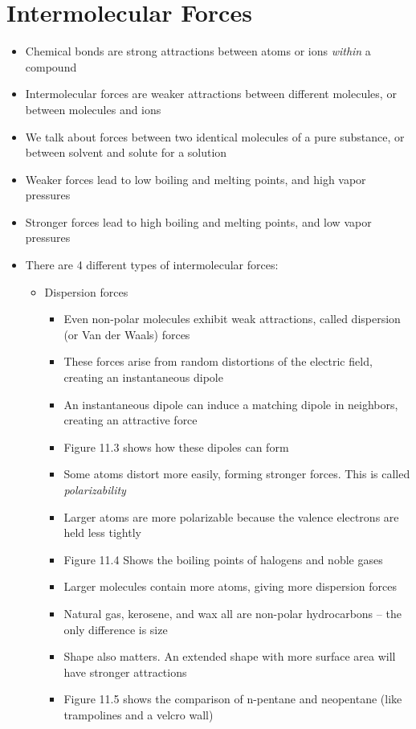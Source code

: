 \documentclass[12pt, openany, letterpaper]{memoir}
\begin{document}
\section{Intermolecular Forces}
\begin{itemize}
	\item Chemical bonds are strong attractions between atoms or ions \emph{within} a compound
	\item Intermolecular forces are weaker attractions between different molecules, or between molecules and ions
	\item We talk about forces between two identical molecules of a pure substance, or between solvent and solute for a solution
	\item Weaker forces lead to low boiling and melting points, and high vapor pressures
	\item Stronger forces lead to high boiling and melting points, and low vapor pressures
	\item There are 4 different types of intermolecular forces:
	\begin{itemize}		
		\item Dispersion forces
		\begin{itemize}
			\item Even non-polar molecules exhibit weak attractions, called dispersion (or Van der Waals) forces
			\item These forces arise from random distortions of the electric field, creating an instantaneous dipole
			\item An instantaneous dipole can induce a matching dipole in neighbors, creating an attractive force
			\item Figure 11.3 shows how these dipoles can form
			\item Some atoms distort more easily, forming stronger forces. This is called \emph{polarizability}
			\item Larger atoms are more polarizable because the valence electrons are held less tightly
      \item Figure 11.4 Shows the boiling points of halogens and noble gases
			\item Larger molecules contain more atoms, giving more dispersion forces
			\item Natural gas, kerosene, and wax all are non-polar hydrocarbons -- the only difference is size
			\item Shape also matters. An extended shape with more surface area will have stronger attractions
			\item Figure 11.5 shows the comparison of n-pentane and neopentane (like trampolines and a velcro wall)

\end{itemize}
\end{itemize}
\end{itemize}
\end{document}
